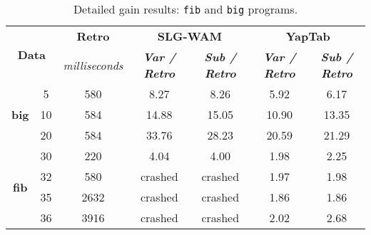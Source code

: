 \begin{table}[ht]
\centering
\footnotesize{
  \begin{tabular}{cc|c|cc|cc}
   \hline
    \hline
    \multicolumn{2}{c|}{\multirow{2}{*}{\small{\textbf{Data}}}} & \textbf{\small{Retro}} & \multicolumn{2}{c|}{\small{\textbf{SLG-WAM}}} & \multicolumn{2}{c}{\small{\textbf{YapTab}}} \\
     \multicolumn{2}{c|}{} & \scriptsize{\textit{milliseconds}} & \textbf{\textit{\scriptsize{Var / Retro}}} & \textbf{\textit{\scriptsize{Sub / Retro}}} & \textbf{\textit{\scriptsize{Var / Retro}}} & \textbf{\textit{\scriptsize{Sub / Retro}}} \\
   \hline
   \hline

\multirow{3}{*}{\textbf{big}} & 5 &  580 &  8.27  &  8.26  &  5.92 & 6.17 \\
&  10 &  584 &  14.88  &  15.05  &  10.90 & 13.35 \\
&  20 &  584 &  33.76  &  28.23  &  20.59 & 21.29 \\
\hline
\multirow{4}{*}{\textbf{fib}} &  30 &  220 &  4.04  &  4.00  &  1.98 & 2.25 \\
&  32 &  580 &  \scriptsize{crashed}  &  \scriptsize{crashed}  &  1.97 & 1.98 \\
&  35 &  2632 &  \scriptsize{crashed}  &  \scriptsize{crashed}  &  1.86 & 1.86 \\
&  36 &  3916 &  \scriptsize{crashed}  &  \scriptsize{crashed}  &  2.02 & 2.68 \\
\hline
\hline
\end{tabular}
}
\caption{Detailed gain results: \texttt{fib} and \texttt{big} programs.}
\label{tbl:results_detail_gain_fib}
\end{table}